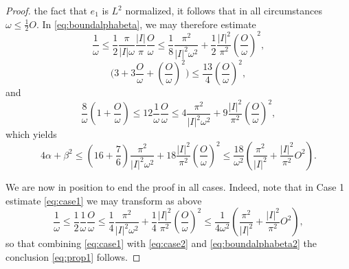 \documentclass[10pt,a4paper]{amsart}
\begin{document}
\begin{proof}
the fact that $e_1$ is $L^2$ normalized, it follows that in all
circumstances $\omega \leq \frac{1}{2}O.$ 
In \eqref{eq:boundalphabeta}, we may therefore estimate
$$
\frac{1}{\omega} \leq \frac{1}{2}\frac{\pi}{|I|\omega} \frac{|I|}{\pi}
\frac{O}{\omega} \leq \frac{1}{8} \frac{\pi^2}{|I|^2\omega^2} +
\frac{1}{2} \frac{|I|^2}{\pi^2}(\frac{O}{\omega})^2,
$$
$$
\big(3 + 3\frac{O}{\omega} + (\frac{O}{\omega})^2\big) \leq \frac{13}{4}(
\frac{O}{\omega})^2,
$$
and 
$$
\frac{8}{\omega}(1+ \frac{O}{\omega}) \leq 12 \frac{1}{\omega} \frac{O}{\omega} 
\leq 4\frac{\pi^2}{|I|^2\omega^2} + 9
\frac{|I|^2}{\pi^2} (\frac{O}{\omega})^2,
$$
which yields
\begin{equation}\label{eq:boundalphabeta2}
4\alpha + \beta^2 \leq (16 + \frac{7}{6}) \frac{\pi^2}{|I|^2\omega^2} +
18\frac{|I|^2}{\pi^2} (\frac{O}{\omega})^2 \leq \frac{18}{\omega^2} 
\left( \frac{\pi^2}{|I|^2} +
\frac{|I|^2}{\pi^2} O^2\right).
\end{equation}

We are now in position to end the proof in all cases. Indeed, note that in 
Case 1 estimate \eqref{eq:case1} we may transform as above  
$$
\frac{1}{\omega}  \leq \frac{1}{2}\frac{1}{\omega}\frac{O}{\omega} 
\leq 
\frac{1}{4}\frac{\pi^2}{|I|^2\omega^2} + 
\frac{1}{4}\frac{|I|^2}{\pi^2}(\frac{O}{\omega})^2
\leq
\frac{1}{4\omega^2} \left( \frac{\pi^2}{|I|^2} +
\frac{|I|^2}{\pi^2} O^2\right),
$$
so that combining \eqref{eq:case1} with \eqref{eq:case2} and
\eqref{eq:boundalphabeta2} the conclusion \eqref{eq:prop1} follows.  
\end{proof}
\end{document}
